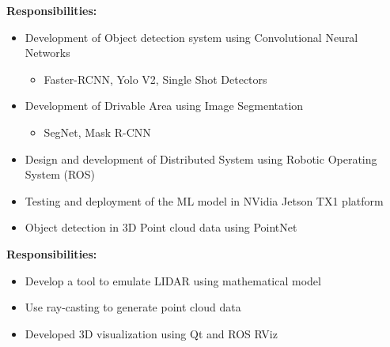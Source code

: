 \documentclass[10pt,a4paper,ragged2e,withhyper]{altacv}
\begin{document}
            \smallskip
            \textbf{Responsibilities:}\\
            \vspace{0.5em}
            \begin{itemize}
                \item Development of Object detection system using Convolutional Neural Networks
                    \begin{itemize}
                        \item Faster-RCNN, Yolo V2, Single Shot Detectors
                    \end{itemize}
                \item Development of Drivable Area using Image Segmentation
                    \begin{itemize}
                        \item SegNet, Mask R-CNN
                    \end{itemize}
                \item Design and development of Distributed System using Robotic Operating System (ROS)
                \item Testing and deployment of the ML model in NVidia Jetson TX1 platform
                \item Object detection in 3D Point cloud data using PointNet
            \end{itemize}
            \divider

            \smallskip
            \textbf{Responsibilities:}\\
            \vspace{0.5em}
            \begin{itemize}
                \item Develop a tool to emulate LIDAR using mathematical model
                \item Use ray-casting to generate point cloud data
                \item Developed 3D visualization using Qt and ROS RViz
            \end{itemize}
            \divider
\end{document}
